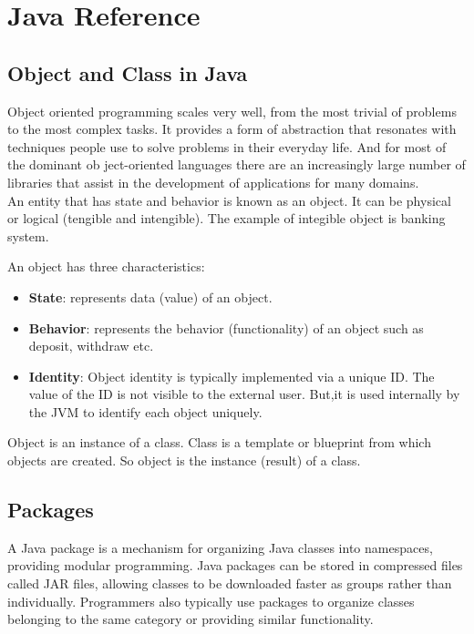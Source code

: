 \pagestyle{pippo}
\chapter{Java Reference}
\label{ch:jr}

\section{Object and Class in Java}
Object oriented programming scales very well, from the most trivial of problems to the most complex tasks. It provides a form of abstraction that resonates with techniques people use to solve problems in their everyday life. And for most of the dominant ob ject-oriented languages there are an increasingly large number of
libraries that assist in the development of applications for many domains.\cite{javareference}\\

An entity that has state and behavior is known as an object. It can be physical or logical (tengible and intengible). The example of integible object is banking system.

An object has three characteristics:

\begin{itemize}
\item {\bfseries State}: represents data (value) of an object.
\item {\bfseries Behavior}: represents the behavior (functionality) of an object such as deposit, withdraw etc.
\item {\bfseries Identity}: Object identity is typically implemented via a unique ID. The value of the ID is not visible to the external user. But,it is used internally by the JVM to identify each object uniquely.
\end{itemize}

Object is an instance of a class. Class is a template or blueprint from which objects are created. So object is the instance (result) of a class.

\section{Packages}\label{sec:package}
A Java package is a mechanism for organizing Java classes into namespaces, providing modular programming. Java packages can be stored in compressed files called JAR files, allowing classes to be downloaded faster as groups rather than individually. Programmers also typically use packages to organize classes belonging to the same category or providing similar functionality.

